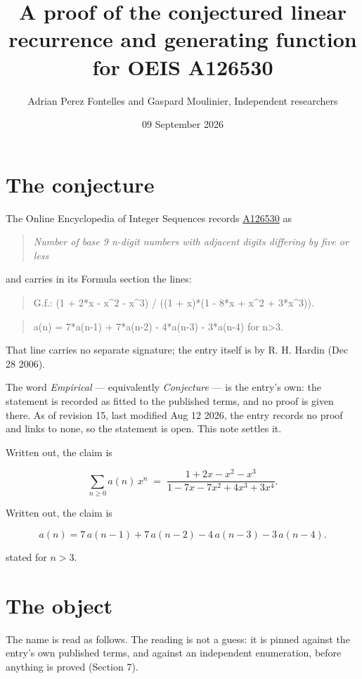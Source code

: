 \documentclass[11pt]{article}
\title{A proof of the conjectured linear recurrence and generating function for OEIS A126530}
\author{Adrian Perez Fontelles and Gaspard Moulinier, Independent researchers}
\date{09 September 2026}
\theoremstyle{definition}
\begin{document}
\maketitle
\section{The conjecture}

The Online Encyclopedia of Integer Sequences records \href{https://oeis.org/A126530}{A126530} as

\begin{quote}\itshape Number of base 9 n-digit numbers with adjacent digits differing by five or less\end{quote}

and carries in its Formula section the lines:

\begin{quote}\ttfamily G.f.: (1 + 2*x - x\textasciicircum{}2 - x\textasciicircum{}3) / ((1 + x)*(1 - 8*x + x\textasciicircum{}2 + 3*x\textasciicircum{}3)).\end{quote}

\begin{quote}\ttfamily a(n) = 7*a(n-1) + 7*a(n-2) - 4*a(n-3) - 3*a(n-4) for n>3.\end{quote}

That line carries no separate signature; the entry itself is by R. H. Hardin (Dec 28 2006).

The word {\itshape Empirical} --- equivalently {\itshape Conjecture} --- is the entry's own: the statement is recorded as fitted to the published terms, and no proof is given there. As of revision 15, last modified Aug 12 2026, the entry records no proof and links to none, so the statement is open. This note settles it.

Written out, the claim is

\[\sum_{n \ge 0} a(n)\,x^n \;=\; \frac{1 + 2x - x^{2} - x^{3}}{1 - 7x - 7x^{2} + 4x^{3} + 3x^{4}}.\]

Written out, the claim is

\[a(n) = 7\,a(n-1) + 7\,a(n-2) - 4\,a(n-3) - 3\,a(n-4).\]

stated for $n > 3$.

\section{The object}

The name is read as follows. The reading is not a guess: it is pinned against the entry's own published terms, and against an independent enumeration, before anything is proved (Section 7).
\end{document}
